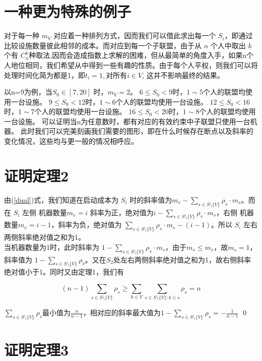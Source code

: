 \documentclass[UTF8]{article}
\begin{document}
\section{一种更为特殊的例子}
对于每一种 $m_V$ 对应着一种排列方式，因而我们可以借此求出每一个 $S_i$，即通过比较设施数量彼此相邻的成本。而对应到每一个子联盟，由于从 $n$ 个人中取出 $k$ 个有 $C^k_n$种取法,因而会造成指数上求解的困难，但从最简单的角度入手，如果n个人地位相同，我们希望从中得到一些有趣的性质。由于每个人平权，则我们可以将处理时间化简为都是1，即$t_i=1, \text{对所有} i \in V$, 这并不影响最终的结果。
\par
以n=9为例，当$ S_0 \in [7,20]$ 时，$m_V=2$。
$6 \leq S_0 < 9 $时，$1 \sim 5$个人的联盟均使用一台设施。
$9 \leq S_0 < 12 $时，$1 \sim 6$个人的联盟均使用一台设施。
$12 \leq S_0 < 16 $时，$1 \sim 7$个人的联盟均使用一台设施。
$16 \leq S_0 < 20 $时，$1 \sim 8$个人的联盟均使用一台设施。
可以证明当n为任意数时，都有对应的有效约束中子联盟只使用一台机器。
此时我们可以完美刻画我们需要的图形，即在什么时候存在断点以及斜率的变化情况，这些均与更一般的情况相呼应。

\section*{证明定理2}
由(\ref{dual})式，我们知道在启动成本为 $S_i$ 时的斜率值为$m_v-\sum_{s\in S \setminus\{V\}} \rho_s \cdot m_s$。而在 $S_i$ 左侧 机器数量$m_v=i$ 斜率为正，绝对值为$i-\sum_{s\in S \setminus\{V\}} \rho_s \cdot m_s$，右侧 机器数量$m_v=i-1$，斜率为负，绝对值为
$\sum_{s\in S \setminus\{V\}} \rho_s \cdot m_s - (i-1) $。所以 $S_i$ 左右两侧斜率绝对值之和为1。\\
当机器数量为1时，此时斜率为 $1-\sum_{s\in S \setminus\{V\}} \rho_s \cdot m_s$，由于$m_s \leq m_v$，故$m_s=1$，斜率值为 $1-\sum_{s\in S \setminus\{V\}} \rho_s $。又在$S_2$处左右两侧斜率绝对值之和为1，故右侧斜率绝对值小于1。同时又由定理1，我们有

\begin{displaymath}
  (n-1) \sum_{s \in S \setminus\{V\} } \rho_s \geq
  \sum_{k\in V}\sum_{s \in S \setminus\{V\}:k \in s} \rho_s = n
\end{displaymath}

$\sum_{s \in S \setminus\{V\}} \rho_s $最小值为$\frac{n}{n-1}$，相对应的斜率最大值为$ 1-\sum_{s\in S \setminus\{V\}} \rho_s =-\frac{1}{n-1}$
\qed


\section*{证明定理3}
\end{document}
